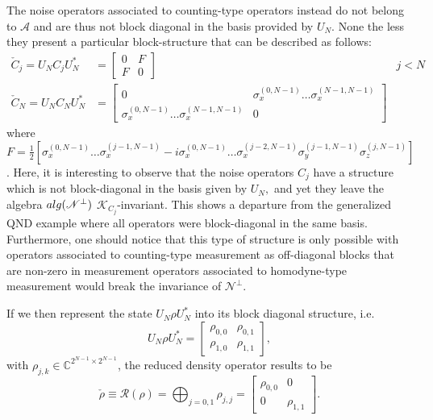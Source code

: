 \documentclass[aihp,12pt]{imsart}
\newcommand{\Rc}{\mathcal{R}}
\newcommand{\Kc}{\mathcal{K}}
\newcommand{\As}{\mathscr{A}}
\newcommand{\Ns}{\mathscr{N}}
\newcommand{\Cb}{\mathbb{C}}
\newcommand{\alg}{{\rm alg}}
\theoremstyle{theorem}
\theoremstyle{definition}
\theoremstyle{remark}
\begin{document}
The noise operators associated to counting-type operators instead do not belong to $\As$ and are thus not block diagonal in the basis provided by $U_N$. None the less they present a particular block-structure that can be described as follows:
\begin{align*}
    \check{C}_j = U_N C_j U_N^* &= \left[\begin{array}{c|c}
         0&F  \\\hline
         F&0
    \end{array}\right] & j<N \\
    \check{C}_N = U_N C_N U_N^* &= \left[\begin{array}{c|c}
         0&\sigma_x^{(0,N-1)}\dots\sigma_x^{(N-1,N-1)}  \\\hline
         \sigma_x^{(0,N-1)}\dots\sigma_x^{(N-1,N-1)}&0
    \end{array}\right] &
\end{align*}
where $F = \frac{1}{2}\left[\sigma_x^{(0,N-1)}\dots\sigma_x^{(j-1,N-1)} -i \sigma_x^{(0,N-1)}\dots\sigma_x^{(j-2,N-1)}\sigma_y^{(j-1,N-1)} \sigma_z^{(j,N-1)}\right]$.
Here, it is interesting to observe that the noise operators $C_j$ have a structure which is not block-diagonal in the basis given by $U_N,$ and yet they leave the algebra $\alg(\Ns^\perp)$ $\Kc_{C_j}$-invariant. This shows a departure from the generalized QND example where all operators were block-diagonal in the same basis. Furthermore, one should notice that this type of structure is only possible with operators associated to counting-type measurement as off-diagonal blocks that are non-zero in measurement operators associated to homodyne-type measurement would break the invariance of $\Ns^\perp$.

If we then represent the state $U_N\rho U_N^*$ into its block diagonal structure, i.e. 
\begin{equation*}
    U_N\rho U_N^* = \left[\begin{array}{c|c}
    \rho_{0,0} & \rho_{0,1}\\\hline
    \rho_{1,0} & \rho_{1,1}
    \end{array}\right], 
\end{equation*}
with $\rho_{j,k}\in\Cb^{2^{N-1}\times 2^{N-1}}$, the reduced density operator results to be 
\[\check{\rho} \equiv \Rc(\rho) = \bigoplus_{j=0,1} {\rho}_{j,j}
= \left[\begin{array}{c|c}
    \rho_{0,0} & 0\\\hline
    0 & \rho_{1,1}
    \end{array}\right].
\]
\end{document}
